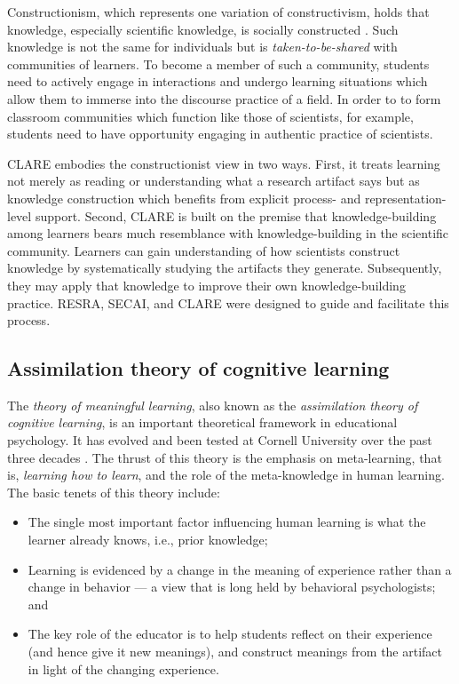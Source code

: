 Constructionism, which represents one variation of constructivism, holds
that knowledge, especially scientific knowledge, is socially constructed
\cite{Berger66,Knorr-Cetina81}. Such knowledge is not the same for
individuals but is {\it taken-to-be-shared\/} \cite{Roth92} with
communities of learners. To become a member of such a community, students
need to actively engage in interactions and undergo learning situations
which allow them to immerse into the discourse practice of a field. In
order to to form classroom communities which function like those of
scientists, for example, students need to have opportunity engaging in
authentic practice of scientists.

CLARE embodies the constructionist view in two ways. First, it treats
learning not merely as reading or understanding what a research artifact
says but as knowledge construction which benefits from explicit process-
and representation-level support.  Second, CLARE is built on the premise
that knowledge-building among learners bears much resemblance with
knowledge-building in the scientific community. Learners can gain
understanding of how scientists construct knowledge by systematically
studying the artifacts they generate. Subsequently, they may apply that
knowledge to improve their own knowledge-building practice.  RESRA, SECAI,
and CLARE were designed to guide and facilitate this process.


\subsection{Assimilation theory of cognitive learning}

The {\it theory of meaningful learning\/}, also known as the {\it
assimilation theory of cognitive learning\/}, is an important theoretical
framework in educational psychology. It has evolved and been tested at
Cornell University over the past three decades \cite{Ausubel63,Novak84}.
The thrust of this theory is the emphasis on meta-learning, that is, {\it
learning how to learn\/}, and the role of the meta-knowledge in human
learning.  The basic tenets of this theory include:

\begin{itemize}
\item The single most important factor influencing human learning is what
  the learner already knows, i.e., prior knowledge;
  
\item Learning is evidenced by a change in the meaning of experience
  rather than a change in behavior --- a view that is long held by
  behavioral psychologists; and
  
\item The key role of the educator is to help students reflect on their
  experience (and hence give it new meanings), and construct meanings from
  the artifact in light of the changing experience.
\end{itemize}

